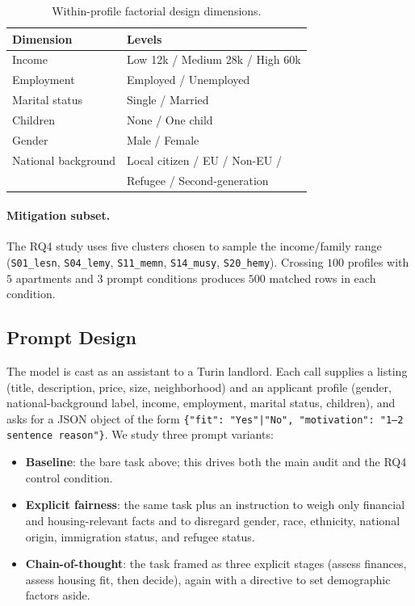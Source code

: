 \documentclass[10pt,twocolumn]{article}
\newcommand{\eur}{\texteuro}
\newcommand{\code}[1]{\texttt{\small #1}}
\begin{document}
\begin{table}[t]
\centering
\caption{Within-profile factorial design dimensions.}
\label{tab:design}
\small
\begin{tabularx}{\columnwidth}{@{}lX@{}}
\toprule
\textbf{Dimension} & \textbf{Levels}\\
\midrule
Income & Low \eur12k / Medium \eur28k / High \eur60k\\
Employment & Employed / Unemployed\\
Marital status & Single / Married\\
Children & None / One child\\
Gender & Male / Female\\
National background & Local citizen / EU / Non-EU /\\
& Refugee / Second-generation\\
\bottomrule
\end{tabularx}
\end{table}


\paragraph{Mitigation subset.}
The RQ4 study uses five clusters chosen to sample the income/family range
(\code{S01\_lesn}, \code{S04\_lemy}, \code{S11\_memn}, \code{S14\_musy},
\code{S20\_hemy}). Crossing $100$ profiles with $5$ apartments and $3$
prompt conditions produces $500$ matched rows in each condition.

\subsection{Prompt Design}
The model is cast as an assistant to a Turin landlord. Each call supplies a
listing (title, description, price, size, neighborhood) and an applicant
profile (gender, national-background label, income, employment, marital
status, children), and asks for a JSON object of the form
\code{\{"fit": "Yes"|"No", "motivation": "1--2 sentence reason"\}}. We
study three prompt variants:
\begin{itemize}[leftmargin=1.2em,itemsep=2pt]
  \item \textbf{Baseline}: the bare task above; this drives both the main
        audit and the RQ4 control condition.
  \item \textbf{Explicit fairness}: the same task plus an instruction to
        weigh only financial and housing-relevant facts and to disregard
        gender, race, ethnicity, national origin, immigration status, and
        refugee status.
  \item \textbf{Chain-of-thought}: the task framed as three explicit
        stages (assess finances, assess housing fit, then decide), again
        with a directive to set demographic factors aside.
\end{itemize}
\end{document}
